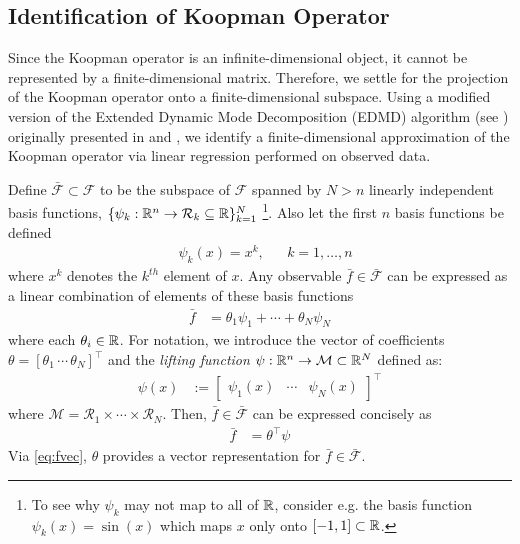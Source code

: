 \subsection{Identification of Koopman Operator}
\label{sec:koopid}

Since the Koopman operator is an infinite-dimensional object, it cannot be represented by a finite-dimensional matrix. 
Therefore, we settle for the projection of the Koopman operator onto a finite-dimensional subspace.
Using a modified version of the Extended Dynamic Mode Decomposition (EDMD) algorithm (see \cite{williams2015data}) originally presented in \cite{mauroy2016linear} and \cite{mauroy2017koopman}, we identify a finite-dimensional approximation of the Koopman operator via linear regression performed on observed data.

Define ${\bar{\mathcal{F}} \subset \mathcal{F}}$ to be the subspace of $\mathcal{F}$ spanned by ${N>n}$ linearly independent basis functions, 
${ \{ \psi_k : \mathbb{R}^n \to \mathcal{R}_k \subseteq \mathbb{R} \}_{k=1}^N}$
\footnote{To see why $\psi_k$ may not map to all of $\mathbb{R}$, consider e.g. the basis function $\psi_k(x) = \sin{(x)}$ which maps $x$ only onto $[-1,1] \subset \mathbb{R}$.}.
Also let the first $n$ basis functions be defined
\begin{align}
    &\psi_k(x) = x^k , && k = 1, \dots , n
    \label{eq:xinpsi}
\end{align}
where $x^k$ denotes the $k^{th}$ element of $x$.
Any observable $\bar{f} \in \bar{\mathcal{F}}$ can be expressed as a linear combination of elements of these basis functions
\begin{align}
    \bar{f} &= \theta_1 \psi_1 + \cdots + \theta_N \psi_N
\end{align}
where each $\theta_i \in \mathbb{R}$.
For notation, we introduce the vector of coefficients ${\theta = [ \theta_1 \,  \cdots \, \theta_N ]^\top}$ and the \emph{lifting function} ${\psi : \mathbb{R}^n \to \mathcal{M} \subset \mathbb{R}^N}$ defined as:
\begin{align}
    \psi(x) &:= \begin{bmatrix} \psi_1 (x) & \cdots & \psi_N (x) \end{bmatrix}^\top
    \label{eq:lift}
\end{align}
where $\mathcal{M} = \mathcal{R}_1 \times \cdots \times \mathcal{R}_N$.
Then, $\bar{f} \in \bar{\mathcal{F}}$ can be expressed concisely as
\begin{align}
    \bar{f} &= \theta^\top \psi
    \label{eq:fvec}
\end{align}
Via \ref{eq:fvec}, $\theta$ provides a vector representation for $\bar{f} \in \bar{\mathcal{F}}$.

